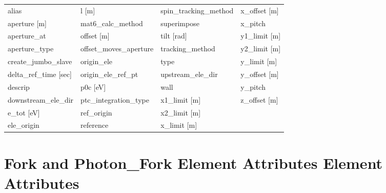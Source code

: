  \begin{tabular}{llll} \toprule
alias                          & l [m]                          & spin_tracking_method           & x_offset [m]                   \\
aperture [m]                   & mat6_calc_method               & superimpose                    & x_pitch                        \\
aperture_at                    & offset [m]                     & tilt [rad]                     & y1_limit [m]                   \\
aperture_type                  & offset_moves_aperture          & tracking_method                & y2_limit [m]                   \\
create_jumbo_slave             & origin_ele                     & type                           & y_limit [m]                    \\
delta_ref_time [sec]           & origin_ele_ref_pt              & upstream_ele_dir               & y_offset [m]                   \\
descrip                        & p0c [eV]                       & wall                           & y_pitch                        \\
downstream_ele_dir             & ptc_integration_type           & x1_limit [m]                   & z_offset [m]                   \\
e_tot [eV]                     & ref_origin                     & x2_limit [m]                   &                                \\
ele_origin                     & reference                      & x_limit [m]                    &                                \\
 \bottomrule
 \end{tabular}
 \vfill

 \section{Fork and Photon_Fork Element Attributes Element Attributes}
 \label{s:list.fork}

